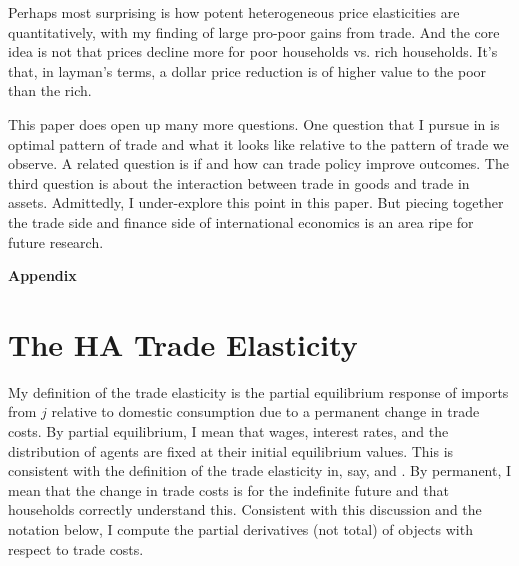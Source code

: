 \documentclass[12pt,pdftex]{article}
\begin{document}
\begin{onehalfspacing}
Perhaps most surprising is how potent heterogeneous price elasticities are quantitatively, with my finding of large pro-poor gains from trade. And the core idea is not that prices decline more for poor households vs. rich households. It's that, in layman's terms, a dollar price reduction is of higher value to the poor than the rich.

This paper does open up many more questions. One question that I pursue in \citet{waughoptimal} is optimal pattern of trade and what it looks like relative to the pattern of trade we observe. A related question is if and how can trade policy improve outcomes. The third question is about the interaction between trade in goods and trade in assets.  Admittedly, I under-explore this point in this paper. But piecing together the trade side and finance side of international economics is an area ripe for future research.


\appendix

\clearpage
\newpage

\begin{center}
\textbf{\Large Appendix}
\end{center}


\section{The HA Trade Elasticity}

My definition of the trade elasticity is the partial equilibrium response of imports from $j$ relative to domestic consumption due to a permanent change in trade costs. By partial equilibrium, I mean that wages, interest rates, and the distribution of agents are fixed at their initial equilibrium values. This is consistent with the definition of the trade elasticity in, say, \citet{arkolakis2012new} and \citet{simonovska2014elasticity}. By permanent, I mean that the change in trade costs is for the indefinite future and that households correctly understand this. Consistent with this discussion and the notation below, I compute the partial derivatives (not total) of objects with respect to trade costs.


\end{onehalfspacing}
\end{document}
